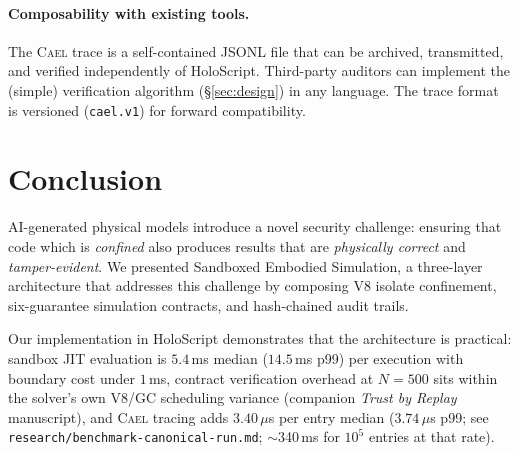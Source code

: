 \documentclass[letterpaper,twocolumn,10pt]{article}
\newcommand{\cael}{\textsc{Cael}}
\newcommand{\holoscript}{HoloScript}
\begin{document}
\paragraph{Composability with existing tools.}
The \cael{} trace is a self-contained JSONL file that can be archived,
transmitted, and verified independently of \holoscript{}. Third-party
auditors can implement the (simple) verification algorithm
(\S\ref{sec:design}) in any language. The trace format is versioned
(\texttt{cael.v1}) for forward compatibility.


\section{Conclusion}
\label{sec:conclusion}

AI-generated physical models introduce a novel security challenge:
ensuring that code which is \emph{confined} also produces results
that are \emph{physically correct} and \emph{tamper-evident}. We
presented Sandboxed Embodied Simulation, a three-layer architecture
that addresses this challenge by composing V8 isolate confinement,
six-guarantee simulation contracts, and hash-chained audit trails.

Our implementation in \holoscript{} demonstrates that the architecture
is practical: sandbox JIT evaluation is $5.4$\,ms median ($14.5$\,ms p99)
per execution with boundary cost under $1$\,ms, contract verification
overhead at $N{=}500$ sits within the solver's own V8/GC scheduling variance
(companion \emph{Trust by Replay} manuscript), and \cael{} tracing adds
$3.40$\,$\mu$s per entry median ($3.74$\,$\mu$s p99; see \texttt{research/benchmark-canonical-run.md}; $\sim$340\,ms for $10^5$
entries at that rate).
\end{document}
